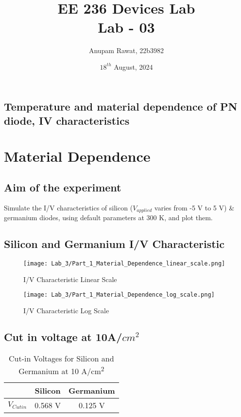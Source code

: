 \documentclass[a4paper]{article}
\title{EE 236 Devices Lab \\ Lab - 03}
\author{Anupam Rawat, 22b3982}
\date{${18^{th}}$ August, 2024}
\begin{document}
\maketitle
\begin{center}
    \section*{Temperature and material dependence of PN diode, IV characteristics}    
\end{center}


\section{Material Dependence}

\subsection{Aim of the experiment}
Simulate the I/V characteristics of silicon (${V_{applied}}$ varies from -5 V to 5 V) \& germanium diodes, using default parameters at 300 K, and plot them. 

\subsection{Silicon and Germanium I/V Characteristic}
\begin{figure}[h!]
    \centering
    \texttt{[image: Lab\_3/Part\_1\_Material\_Dependence\_linear\_scale.png]}
    \caption{I/V Characteristic Linear Scale}
\end{figure}

\newpage

\begin{figure}[h!]
    \centering
    \texttt{[image: Lab\_3/Part\_1\_Material\_Dependence\_log\_scale.png]}
    \caption{I/V Characteristic Log Scale}
\end{figure}

\subsection{Cut in voltage at 10A/$cm^2$}
\begin{table}[h!]
\centering
\begin{tabular}{|c|c|c|}
\hline
                     & \textbf{Silicon} & \textbf{Germanium} \\ \hline
\textbf{${V_{Cut in}}$} & 0.568 V          & 0.125 V           \\ \hline
\end{tabular}
\caption{Cut-in Voltages for Silicon and Germanium at 10 A/cm\textsuperscript{2}}
\label{tab:cutin_voltages_transposed}
\end{table}
\end{document}
